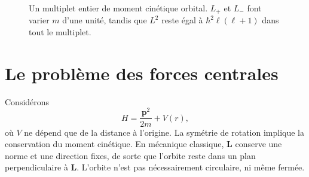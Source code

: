 \begin{figure}[htbp]\centering
{}\caption{Un multiplet entier de moment cinétique orbital. \(L_+\) et \(L_-\) font varier \(m\) d’une unité, tandis que \(L^2\) reste égal à \(\hbar^2\ell(\ell+1)\) dans tout le multiplet.}\end{figure}

\section{Le problème des forces centrales}

Considérons
\begin{equation}
H=\frac{\mathbf p^2}{2m}+V(r),
\end{equation}
où \(V\) ne dépend que de la distance à l’origine. La symétrie de rotation implique la conservation du moment cinétique. En mécanique classique, \(\mathbf L\) conserve une norme et une direction fixes, de sorte que l’orbite reste dans un plan perpendiculaire à \(\mathbf L\). L’orbite n’est pas nécessairement circulaire, ni même fermée.

